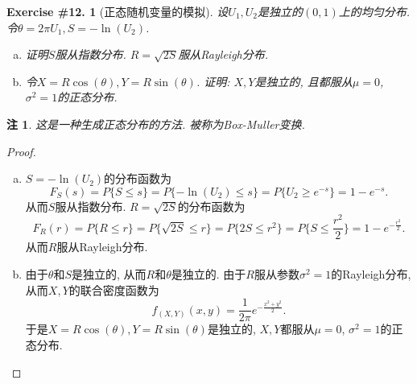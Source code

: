 \documentclass[UTF8, a4paper]{article}
\newtheorem{exercise}{Exercise \#12.}
\newtheorem*{remark}{注}
\begin{document}
\begin{framed}
\begin{exercise}[正态随机变量的模拟]
设\(U_1, U_2\)是独立的\((0,1)\)上的均匀分布. 令\(\theta = 2\pi U_1, S = -\ln(U_2)\).
\begin{enumerate}[a)]
    \item 证明\(S\)服从指数分布. \(R = \sqrt{2S}\)服从Rayleigh分布.
    \item 令\(X = R\cos(\theta), Y = R\sin(\theta)\). 证明: \(X,Y\)是独立的, 且都服从\(\mu = 0\), \(\sigma^2 = 1\)的正态分布.
\end{enumerate}
\end{exercise}
\end{framed}
\begin{remark}
这是一种生成正态分布的方法. 被称为Box-Muller变换.
\end{remark}


\begin{proof}
\begin{enumerate}[a)]
    \item \(S = -\ln(U_2)\)的分布函数为
    $$
    F_S(s) = P\{S \leq s\} = P\{-\ln(U_2) \leq s\} = P\{U_2 \geq e^{-s}\} = 1 - e^{-s}.
    $$
    从而\(S\)服从指数分布.
    \(R = \sqrt{2S}\)的分布函数为
    $$
    F_R(r) = P\{R \leq r\} = P\{\sqrt{2S} \leq r\} = P\{2S \leq r^2\} = P\{S \leq \frac{r^2}{2}\} = 1 - e^{-\frac{r^2}{2}}.
    $$
    从而\(R\)服从Rayleigh分布.
    \item 由于\(\theta\)和\(S\)是独立的, 从而\(R\)和\(\theta\)是独立的.
    由于\(R\)服从参数\(\sigma^2 = 1\)的Rayleigh分布, 从而\(X,Y\)的联合密度函数为
    $$
    f_{(X,Y)}(x,y) = \frac{1}{2\pi} e^{-\frac{x^2+y^2}{2}}.
    $$
    于是\(X = R\cos(\theta), Y = R\sin(\theta)\)是独立的, \(X,Y\)都服从\(\mu = 0\), \(\sigma^2 = 1\)的正态分布.
\end{enumerate}
\end{proof}







\end{document}
